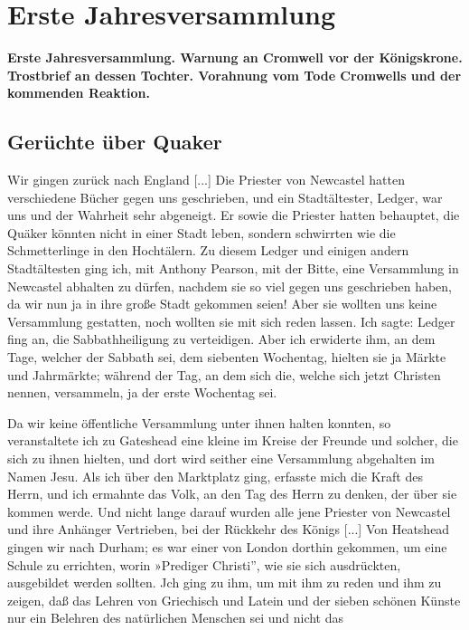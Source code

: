 

\chapter[Erste Jahresversammlung]{Erste Jahresversammlung}

\begin{center}
\textbf{Erste Jahresversammlung. Warnung an Cromwell vor 
der Königskrone. Trostbrief an dessen Tochter. Vorahnung 
vom Tode Cromwells und der kommenden Reaktion.}
\end{center}

\section{Gerüchte über Quaker}

Wir gingen zurück nach England [...] Die Priester
von Newcastel hatten verschiedene Bücher gegen uns geschrieben,
und ein Stadtältester, Ledger, war uns und der 
Wahrheit sehr  abgeneigt. Er sowie die Priester hatten 
behauptet, die Quäker könnten
nicht in einer Stadt leben, sondern schwirrten wie die Schmetterlinge
in den Hochtälern.  Zu diesem 
Ledger und einigen andern Stadtältesten ging ich, mit 
Anthony Pearson, mit der Bitte, eine 
Versammlung in Newcastel abhalten zu dürfen, 
nachdem sie so viel
gegen uns geschrieben haben, da wir nun ja in ihre große Stadt
gekommen seien! Aber sie wollten uns keine Versammlung gestatten, 
noch wollten sie mit sich reden lassen. 
Ich sagte: 
Ledger fing an, die Sabbathheiligung  
 zu verteidigen. Aber ich
erwiderte ihm, an dem Tage, welcher der Sabbath sei, dem siebenten
Wochentag, hielten sie ja Märkte und Jahrmärkte; während der Tag,
an dem sich die, welche sich jetzt Christen nennen, versammeln, ja
der erste Wochentag sei. 


Da wir keine öffentliche Versammlung
unter ihnen halten konnten, so veranstaltete 
ich zu Gateshead
eine kleine im Kreise der Freunde und solcher, die sich zu ihnen
hielten, und dort wird seither eine Versammlung abgehalten im
Namen Jesu. Als ich über den Marktplatz ging, erfasste mich
die Kraft des Herrn, und ich ermahnte das Volk, an den Tag
des Herrn zu denken, der über sie kommen werde. Und nicht
lange darauf wurden alle jene Priester von Newcastel und ihre
Anhänger Vertrieben, bei der Rückkehr des Königs [...] Von
Heatshead gingen wir nach Durham; es war einer von London
dorthin gekommen, um eine Schule zu errichten, worin »Prediger
Christi'', wie sie sich ausdrückten, ausgebildet werden sollten. Jch
ging zu ihm, um mit ihm zu reden und ihm zu zeigen, daß das
Lehren von Griechisch und Latein und der sieben schönen Künste
nur ein Belehren des natürlichen Menschen sei und nicht das



